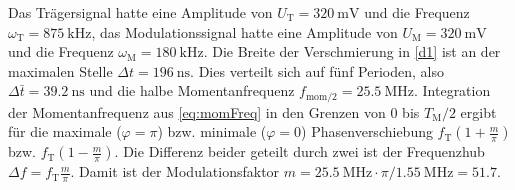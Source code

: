 Das Trägersignal hatte eine Amplitude von $U_\text{T}=\SI{320}{\milli\volt}$ und die Frequenz $\omega_\text{T}=\SI{875}{\kilo\hertz}$, das Modulationssignal hatte eine Amplitude von $U_\text{M}=\SI{320}{\milli\volt}$ und die Frequenz $\omega_\text{M}=\SI{180}{\kilo\hertz}$. Die Breite der Verschmierung in \autoref{d1} ist an der maximalen Stelle $\Delta t = \SI{196}{\nano\second}$. Dies verteilt sich auf fünf Perioden, also $\Delta \bar{t} = \SI{39.2}{\nano\second}$ und die halbe Momentanfrequenz $f_\text{mom/2} = \SI{25.5}{\mega\hertz}$. Integration der Momentanfrequenz aus \autoref{eq:momFreq} in den Grenzen von $0$ bis $T_\text{M}/2$ ergibt für die maximale ($\varphi = \pi$) bzw. minimale ($\varphi = 0$) Phasenverschiebung $f_\text{T}\left(1 + \frac{m}{\pi}\right)$ bzw. $f_\text{T}\left(1 - \frac{m}{\pi}\right)$. Die Differenz beider geteilt durch zwei ist der Frequenzhub $\Delta f = f_\text{T} \frac{m}{\pi}$. Damit ist der Modulationsfaktor $m = \SI{25.5}{\mega\hertz} \cdot \pi / \SI{1.55}{\mega\hertz} = 51.7$.

